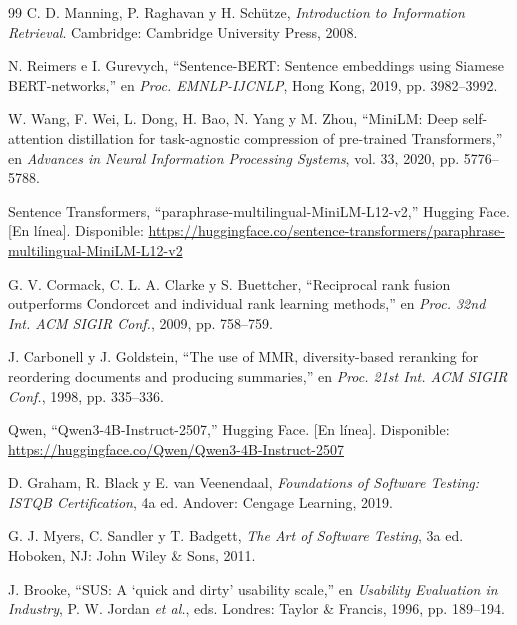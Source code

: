 \documentclass[conference,letterpaper]{IEEEtran}
\begin{document}
\begin{thebibliography}{99}
C. D. Manning, P. Raghavan y H. Schütze, \emph{Introduction to Information Retrieval}. Cambridge: Cambridge University Press, 2008.

N. Reimers e I. Gurevych, ``Sentence-BERT: Sentence embeddings using Siamese BERT-networks,'' en \emph{Proc. EMNLP-IJCNLP}, Hong Kong, 2019, pp. 3982--3992.

W. Wang, F. Wei, L. Dong, H. Bao, N. Yang y M. Zhou, ``MiniLM: Deep self-attention distillation for task-agnostic compression of pre-trained Transformers,'' en \emph{Advances in Neural Information Processing Systems}, vol. 33, 2020, pp. 5776--5788.

Sentence Transformers, ``paraphrase-multilingual-MiniLM-L12-v2,'' Hugging Face. [En línea]. Disponible: \url{https://huggingface.co/sentence-transformers/paraphrase-multilingual-MiniLM-L12-v2}

G. V. Cormack, C. L. A. Clarke y S. Buettcher, ``Reciprocal rank fusion outperforms Condorcet and individual rank learning methods,'' en \emph{Proc. 32nd Int. ACM SIGIR Conf.}, 2009, pp. 758--759.

J. Carbonell y J. Goldstein, ``The use of MMR, diversity-based reranking for reordering documents and producing summaries,'' en \emph{Proc. 21st Int. ACM SIGIR Conf.}, 1998, pp. 335--336.

Qwen, ``Qwen3-4B-Instruct-2507,'' Hugging Face. [En línea]. Disponible: \url{https://huggingface.co/Qwen/Qwen3-4B-Instruct-2507}

D. Graham, R. Black y E. van Veenendaal, \emph{Foundations of Software Testing: ISTQB Certification}, 4a ed. Andover: Cengage Learning, 2019.

G. J. Myers, C. Sandler y T. Badgett, \emph{The Art of Software Testing}, 3a ed. Hoboken, NJ: John Wiley \& Sons, 2011.

J. Brooke, ``SUS: A `quick and dirty' usability scale,'' en \emph{Usability Evaluation in Industry}, P. W. Jordan \emph{et al.}, eds. Londres: Taylor \& Francis, 1996, pp. 189--194.

\end{thebibliography}
\end{document}
